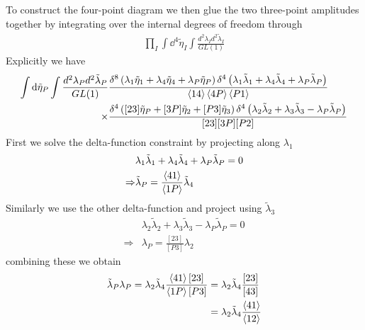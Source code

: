 \documentclass[letter,11pt]{article}
\begin{document}
To construct the four-point diagram we then glue the two three-point amplitudes together by integrating over the internal degrees of freedom through
\begin{equation}
	\begin{aligned}
		\prod_{I}\int \dd^4 \tilde \eta_I \int\frac{d^2\lambda_Id^2\tilde\lambda_I}{GL(1)}
	\end{aligned}
\end{equation}
Explicitly we have
\begin{equation}
	\begin{aligned}
		\int \dd \tilde \eta_{P} \int\frac{d^2\lambda_Pd^2\tilde\lambda_P}{GL(1)}&
		\frac{\delta^{8}\left(\lambda_1\tilde\eta_1+\lambda_{4}\tilde\eta_{4}+\lambda_{P}\tilde\eta_{P}\right)\delta^{4}\left(\lambda_{1}\tilde\lambda_{1}+\lambda_{4}\tilde\lambda_{4}+\lambda_{P}\tilde\lambda_{P}\right)}{\expval{14}\expval{4P}\expval{P1}}\\
		\times&\frac{\delta^{4}\left([23]\tilde\eta_{P}+[3P]\tilde\eta_{2}+[P 3]\tilde\eta_{3}\right)\delta^{4}\left(\lambda_{2}\tilde\lambda_{2}+\lambda_{3}\tilde\lambda_{3}-\lambda_{P}\tilde\lambda_{P}
			\right)}{[23][3P][P2]}
	\end{aligned}
\end{equation}
First we solve the delta-function constraint by projecting along $\lambda_1$
\begin{equation}
	\begin{aligned}
		&\lambda_{1}\tilde\lambda_{1}+\lambda_{4}\tilde\lambda_{4}+\lambda_{P}\tilde\lambda_{P}=0\\
		\Rightarrow& \tilde\lambda_{P}=\frac{\expval{41}}{\expval{1P}}\tilde\lambda_4
	\end{aligned}
\end{equation}
Similarly we use the other delta-function and project using $\tilde \lambda_3$
\begin{equation}
	\begin{aligned}
		&\lambda_{2}\tilde\lambda_{2}+\lambda_{3}\tilde\lambda_{3}-\lambda_{P}\tilde\lambda_{P}=0\\
		\Rightarrow& 
		\lambda_{P}=\frac{[23]}{[P3]}\lambda_2
	\end{aligned}
\end{equation}
combining these we obtain
\begin{equation}
	\begin{aligned}
		\tilde\lambda_P \lambda_P=\lambda_2 \tilde\lambda_4 \frac{\expval{41}[23]}{\expval{1P}[P3]}&=\lambda_2 \tilde\lambda_4 \frac{[23]}{[43]}\\
		&=\lambda_2 \tilde\lambda_4 \frac{\expval{41}}{\expval{12}}
 	\end{aligned}
\end{equation}
\end{document}
